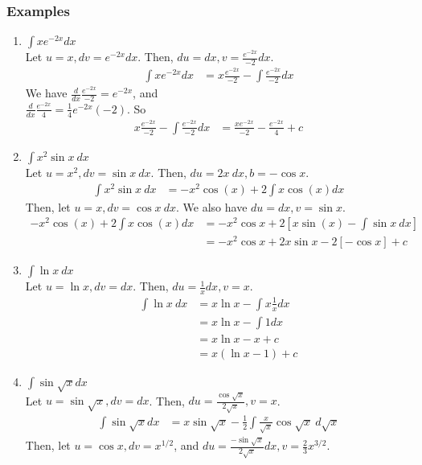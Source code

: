 \documentclass{article}
\begin{document}
\subsubsection{Examples}
\begin{enumerate}
    \item $\int x e^{-2x} dx$\\
    Let $u = x, dv = e^{-2x}dx$. Then, $du = dx, v = \frac{e^{-2x}}{-2}dx$.
    \begin{align*}
        \int x e^{-2x} dx & = x \frac{e^{-2x}}{-2} - \int \frac{e^{-2x}}{-2} dx
    \end{align*}
    We have $\frac{d}{dx}\frac{e^{-2x}}{-2} = e^{-2x}$, and\\
    $\frac{d}{dx} \frac{e^{-2x}}{4} = \frac{1}{4}e^{-2x}(-2)$. So
    \begin{align*}
     x \frac{e^{-2x}}{-2} - \int \frac{e^{-2x}}{-2} dx & = \frac{xe^{-2x}}{-2} - \frac{e^{-2x}}{4} + c
    \end{align*}
    
    \item $\int x^2 \sin x \ dx$\\
    Let $u = x^2, dv = \sin x \ dx$. Then, $du = 2x \ dx, b = -\cos x$.
    \begin{align*}
        \int x^2 \sin x \ dx & = - x^2 \cos(x) + 2 \int x \cos(x) dx
    \end{align*}
    Then, let $u = x, dv = \cos x \ dx$. We also have $du = dx, v = \sin x$.
    \begin{align*}
        - x^2 \cos(x) + 2 \int x \cos(x) dx & = - x^2 \cos x + 2[x \sin(x) - \int \sin x \ dx]\\
        & = -x^2 \cos x + 2x \sin x - 2[-\cos x] + c
    \end{align*}
    
    \item $\int \ln x \ dx$\\
    Let $u = \ln x, dv = dx$. Then, $du = \frac{1}{x} dx, v = x$.
    \begin{align*}
        \int \ln x \ dx & = x \ln x - \int x \frac{1}{x} dx\\
        & = x \ln x - \int 1 dx\\
        & = x \ln x - x + c\\
        & = x(\ln x - 1) + c
    \end{align*}
    
    \item $\int \sin \sqrt{x} dx$\\
    Let $u = \sin \sqrt{x}, dv = dx$. Then, $du = \frac{\cos \sqrt{x}}{2\sqrt{x}}, v = x$.
    \begin{align*}
        \int \sin \sqrt{x} dx & = x \sin \sqrt{x} - \frac{1}{2} \int \frac{x}{\sqrt{x}} \cos \sqrt{x} \ d \sqrt{x}
    \end{align*}
    Then, let $u = \cos{x}, dv = x^{1/2}$, and $du = \frac{- \sin \sqrt{x}}{2 \sqrt{x}}dx, v = \frac{2}{3}x^{3/2}$.
    \begin{align*}
        

\end{align*}
\end{enumerate}
\end{document}
